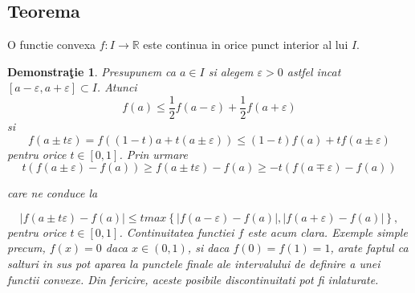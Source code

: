 \documentclass[a4paper,12pt,oneside]{report}
\newtheorem{demonstration}{Demonstra\c tie}
\begin{document}
\subsection{Teorema}
O functie convexa \(f: I \rightarrow \mathbb{R}\) este continua in orice punct interior al lui \(I\). 	


\begin{demonstration}
	Presupunem ca \(a\in I\) si alegem \(\varepsilon > 0\) astfel incat \(\left [ a - \varepsilon , a + \varepsilon  \right ] \subset I\).
 Atunci  
\begin{displaymath}
  f\left ( a \right )\leq \frac{1}{2} f\left ( a - \varepsilon  \right ) + \frac{1}{2}f \left ( a + \varepsilon  \right )
\end{displaymath}
si 
\begin{displaymath}
  f\left ( a \pm t\varepsilon  \right )= f\left ( \left ( 1 - t \right ) a + t\left ( a \pm \varepsilon  \right )\right )\leq \left ( 1 - t \right )f\left ( a \right ) + tf\left ( a\pm \varepsilon  \right )
\end{displaymath}
pentru orice \(t\in \left [ 0 , 1 \right ]\). Prin urmare 
\begin{displaymath}
  t\left ( f\left ( a\pm \varepsilon  \right ) - f\left ( a \right ) \right )\geq f\left ( a\pm t\varepsilon  \right )- f\left ( a \right )\geq -t\left ( f\left ( a\mp \varepsilon  \right ) - f\left ( a \right )\right )
\end{displaymath}

care ne conduce la 

\begin{displaymath}
\left | f\left ( a\pm t\varepsilon  \right )- f\left ( a \right ) \right |\leq t max \left \{ \left | f\left ( a-\varepsilon  \right )- f\left ( a \right ) \right |, \left | f\left ( a+\varepsilon  \right ) - f\left ( a \right )\right | \right \},
\end{displaymath}
 pentru orice \(t\in \left [ 0 , 1 \right ]\). Continuitatea functiei \(f\) este acum clara. 
	Exemple simple precum, \(f\left ( x \right )= 0\) daca \(x\in \left ( 0 , 1 \right )\), si daca \(f\left ( 0 \right )= f\left ( 1 \right ) = 1\), arate faptul ca salturi in sus pot aparea la punctele finale ale intervalului de definire a unei functii convexe. Din fericire, aceste posibile discontinuitati pot fi inlaturate. 

\end{demonstration}
\end{document}
